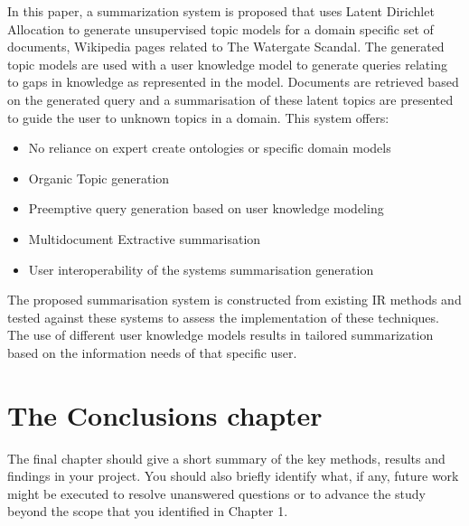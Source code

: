 In this paper, a summarization system is proposed that uses Latent Dirichlet Allocation to generate unsupervised topic models for a domain specific set of documents, Wikipedia pages related to The Watergate Scandal. The generated topic models are used with a user knowledge model to generate queries relating to gaps in knowledge as represented in the model. Documents are retrieved based on the generated query and a summarisation of these latent topics are presented to guide the user to unknown topics in a domain. This system offers:


\begin{itemize}
    \item No reliance on expert create ontologies or specific domain models
    \item Organic Topic generation
    \item Preemptive query generation based on user knowledge modeling
    \item Multidocument Extractive summarisation
    \item User interoperability of the systems summarisation generation    
\end{itemize}

The proposed summarisation system is constructed from existing IR methods and tested against these systems to assess the implementation of these techniques. The use of different user knowledge models results in tailored summarization based on the information needs of that specific user.

\section{The Conclusions chapter}
The final chapter should give a short summary of the key methods, results and findings in your project. You should also briefly identify what, if any, future work might be executed to resolve unanswered questions or to advance the study beyond the scope that you identified in Chapter 1.
